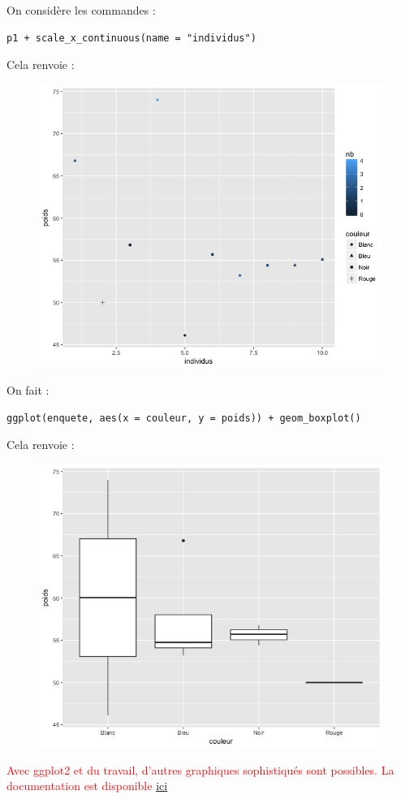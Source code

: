 On considère les commandes :
\begin{lstlisting}[language=html]
p1 + scale_x_continuous(name = "individus")
\end{lstlisting}
Cela renvoie :
\begin{figure}[H]\begin{center}\includegraphics[scale=0.4]{ilu/gra74.png}\end{center}\end{figure}
On fait :
\begin{lstlisting}[language=html]
ggplot(enquete, aes(x = couleur, y = poids)) + geom_boxplot()
\end{lstlisting}
Cela renvoie :
\begin{figure}[H]\begin{center}\includegraphics[scale=0.4]{ilu/gra75.png}\end{center}\end{figure}
\textcolor{red}{Avec ggplot2 et du travail, d'autres graphiques sophistiqués sont possibles. La documentation est disponible \underline{\href{http://docs.ggplot2.org/current/}{ici}}}
